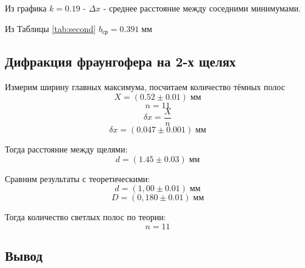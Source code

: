 \documentclass[a4paper, 12pt]{article}
\begin{document}
Из графика  $k = 0.19$ -  $\Delta x$ - среднее расстояние между соседними минимумами.

Из Таблицы \ref{tab:second} $b_{\text{ср}} = 0.391\; \text{мм}$ 


\subsection{Дифракция фраунгофера на 2-х щелях}

Измерим ширину главных максимума, посчитаем количество тёмных полос
\begin{equation*}
    X = (0.52 \pm 0.01)\; \text{мм}
\end{equation*}
\begin{equation*}
    n = 11
\end{equation*}
\begin{equation*}
    \delta x = \frac{X}{n}
\end{equation*}
\begin{equation*}
    \delta x = (0.047 \pm 0.001)\; \text{мм}
\end{equation*}

Тогда расстояние между щелями:
\begin{equation*}
    d = (1.45 \pm 0.03)\; \text{мм}
\end{equation*}

Сравним результаты с теоретическими:
\begin{equation*}
    d = (1,00 \pm 0.01)\; \text{мм}
\end{equation*}
\begin{equation*}
    D = (0,180 \pm 0.01)\; \text{мм}
\end{equation*}

Тогда количество светлых полос по теории:
\begin{equation*}
    n = 11
\end{equation*}

\subsection{Вывод} 
\end{document}
